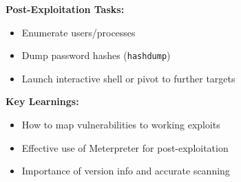 {\textbf{Post-Exploitation Tasks:}
\begin{itemize}[noitemsep]
  \item Enumerate users/processes
  \item Dump password hashes (\texttt{hashdump})
  \item Launch interactive shell or pivot to further targets
\end{itemize}

\textbf{Key Learnings:}
\begin{itemize}[noitemsep]
  \item How to map vulnerabilities to working exploits
  \item Effective use of Meterpreter for post-exploitation
  \item Importance of version info and accurate scanning
\end{itemize}
}
